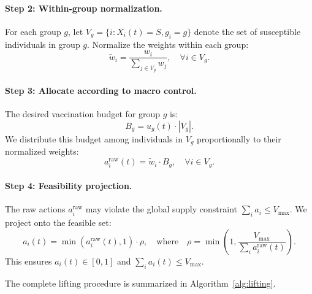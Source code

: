 \paragraph{Step 2: Within-group normalization.}
For each group $g$, let $V_g = \{i : X_i(t)=S, g_i=g\}$ denote the set of susceptible
individuals in group $g$. Normalize the weights within each group:
\begin{equation}
\tilde{w}_i = \frac{w_i}{\sum_{j \in V_g} w_j}, \quad \forall i \in V_g.
\end{equation}

\paragraph{Step 3: Allocate according to macro control.}
The desired vaccination budget for group $g$ is:
\begin{equation}
B_g = u_g(t) \cdot |V_g|.
\end{equation}
We distribute this budget among individuals in $V_g$ proportionally to their normalized
weights:
\begin{equation}
a_i^{\text{raw}}(t) = \tilde{w}_i \cdot B_g, \quad \forall i \in V_g.
\label{eq:raw_action}
\end{equation}

\paragraph{Step 4: Feasibility projection.}
The raw actions $a_i^{\text{raw}}$ may violate the global supply constraint
$\sum_i a_i \leq V_{\max}$. We project onto the feasible set:
\begin{equation}
a_i(t) = \min\left(a_i^{\text{raw}}(t), 1\right) \cdot \rho,
\quad \text{where} \quad
\rho = \min\left(1, \frac{V_{\max}}{\sum_i a_i^{\text{raw}}(t)}\right).
\label{eq:projection}
\end{equation}
This ensures $a_i(t) \in [0,1]$ and $\sum_i a_i(t) \leq V_{\max}$.

The complete lifting procedure is summarized in Algorithm~\ref{alg:lifting}.

